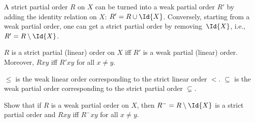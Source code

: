 \documentclass[../../../include/open-logic-section]{subfiles}
\begin{document}
A strict partial order $R$ on $X$ can be turned into a weak partial
order $R'$ by adding the identity relation on $X$: $R' = R \cup \Id{X}$.
Conversely, starting from a weak partial order, one can get a strict
partial order by removing~$\Id{X}$, i.e., $R' = R \setminus \Id{X}$.

\begin{prop}
$R$ is a strict partial (linear) order on $X$ iff $R'$ is a weak
  partial (linear) order. Moreover, $Rxy$ iff $R'xy$ for all $x \neq
  y$.
\end{prop}

\begin{ex}
$\le$ is the weak linear order corresponding to the strict linear
  order $<$. $\subseteq$ is the weak partial order corresponding to the
  strict partial order $\subsetneq$.
\end{ex}

\begin{prob}
Show that if $R$ is a weak partial order on $X$, then
$R^{-}=R \setminus \Id{X}$ is a strict partial order and $Rxy$ iff
$R^{-}xy$ for all $x \neq y$.
\end{prob}
\end{document}
